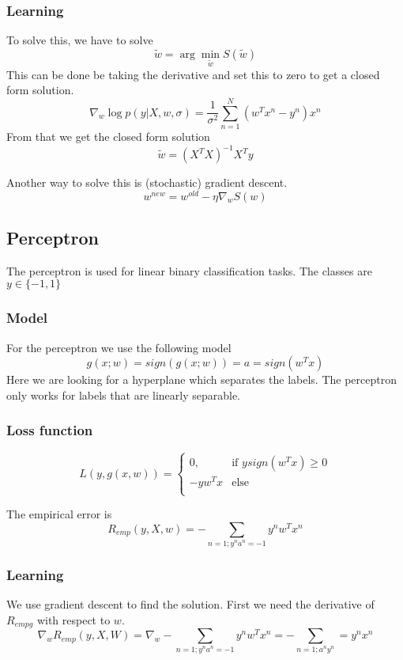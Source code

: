 \documentclass[10pt,a4paper]{article}
\begin{document}
\subsubsection{Learning}
To solve this, we have to solve 
\[ \tilde{w} = \arg \min_{\tilde{w}} S(\tilde{w})\]
This can be done be taking the derivative and set this to zero to get a closed form solution.
\[ \nabla_w \log p(y | X, w, \sigma) = \frac{1}{\sigma^2} \sum_{n=1}^N (w^Tx^n - y^n)x^n \]
From that we get the closed form solution
\[ \tilde{w} = (X^T X)^{-1}X^Ty\]

Another way to solve this is (stochastic) gradient descent.
\[ w^{new} = w^{old} - \eta \nabla_w S(w)\]

\subsection{Perceptron}
The perceptron is used for linear binary classification tasks. The classes are $y \in \{-1,1\}$

\subsubsection{Model}
For the perceptron we use the following model
\[ g(x;w) = sign(g(x;w)) = a = sign(w^Tx) \]
Here we are looking for a hyperplane which separates  the labels. The perceptron only works for labels that are linearly separable.

\subsubsection{Loss function}

\[ L(y,g(x,w)) = \begin{cases}
0, & \text{if } ysign(w^Tx) \geq 0 \\
-y w^Tx & \text{else} \\
\end{cases} \]

The empirical error is 
\[ R_{emp}(y,X,w) = -\sum_{n=1; y^n a^n = -1} y^n w^Tx^n \]
 
\subsubsection{Learning}
We use gradient descent to find the solution. First we need the derivative of $R_{empg}$ with respect to $w$.
\[ \nabla_w R_{emp}(y, X, W) = \nabla_w -  \sum_{n=1; y^n a^n = -1} y^n w^Tx^n = -\sum_{n=1;a^n y^n} = y^n x^n\]
\end{document}
